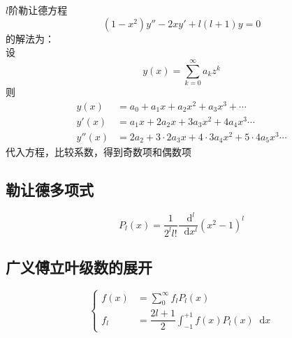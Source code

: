 \documentclass{article}
\newcommand*{\md}{\mathop{}\!\mathrm{d}}
\begin{document}
$l$阶勒让德方程
\begin{equation*}
  \label{eq:1}
  \left( 1 - x^{2} \right) y'' - 2 x y' + l \left( l + 1 \right) y = 0
\end{equation*}
的解法为：\\
设
\begin{equation*}
  \label{eq:2}
  y \left( x \right) = \sum\limits_{k = 0}^{\infty} a_{k} z^{k}
\end{equation*}
则
\begin{equation*}
  \begin{aligned}
    y \left( x\right) &= a_{0} + a_{1}x + a_{2}x^{2} + a_{3}x^{3} + \cdots \\
    y' \left( x \right) &= a_{1}x + 2 a_{2}x + 3 a_{3}x^{2} + 4 a_{4}x^{3} \cdots \\
    y'' \left( x \right) &= 2 a_{2} + 3 \cdot 2  a_{3}x + 4 \cdot 3 a_{4}x^{2} + 5 \cdot 4 a_{5} x^{3} \cdots
  \end{aligned}
\end{equation*}
代入方程，比较系数，得到奇数项和偶数项


\subsection{勒让德多项式}

\begin{equation*}
  \label{eq:6}
  P_{l} \left( x \right) = \dfrac{1}{2^{l} l!} \dfrac{\md^{l}}{\md x^{l}} \left( x^{2} - 1 \right)^{l}
\end{equation*}

\subsection{广义傅立叶级数的展开}

\begin{equation*}
  \label{eq:7}
  \left\{
    \begin{aligned}
      f(x) &= \sum\limits_{0}^{\infty} f_{l} P_{l}(x) \\
      f_{l} &= \dfrac{2l+1}{2} \int_{-1}^{+1} f(x) P_{l}(x) \md x
    \end{aligned}
  \right.
\end{equation*}
\end{document}
